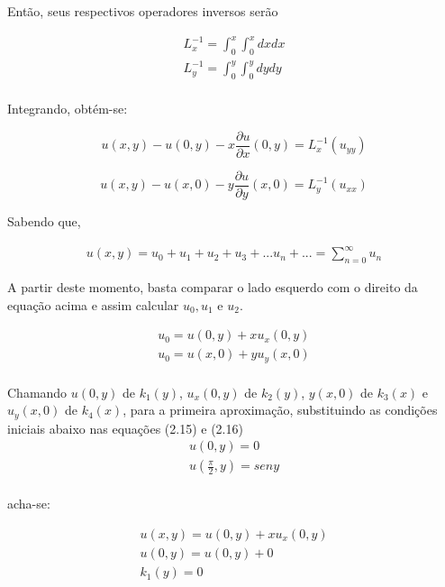 Então, seus respectivos operadores inversos serão

\begin{gather*}
L_{x}^{-1} = \int_0^x \int_0^x  dxdx\\
L_{y}^{-1} = \int_0^y \int_0^y  dydy \\
\end{gather*}

Integrando, obtém-se:

\begin{equation}
u(x,y) - u(0,y) - x\dfrac{\partial u}{\partial x}(0,y) = L_{x}^{-1}(u_{yy})
\end{equation}


\begin{equation}
u(x,y) - u(x,0) - y\dfrac{\partial u}{\partial y}(x,0) = L_{y}^{-1}(u_{xx})  
\end{equation}

Sabendo que,

\begin{gather}
u(x,y) = u_{0} + u_{1} + u_{2} + u_{3} + ... u_{n} + ... = \sum_{n=0}^{\infty}u_{n}
\end{gather}

A partir deste momento, basta comparar o lado esquerdo com o direito da equação acima e assim calcular  $u_{0}, u_{1}$  e $u_{2}$.

\begin{gather}
u_{0} = u(0,y) + xu_{x}(0,y)\nonumber\\
u_{0} = u(x,0) + yu_{y}(x,0)\nonumber\\
\end{gather}

Chamando $u(0,y)$ de  $k_{1}(y)$, $u_{x}(0,y)$ de $k_{2}(y)$, $y(x,0)$ de $k_{3}(x)$ e $u_{y}(x,0)$ de $k_{4}(x)$, para a primeira aproximação, substituindo as condições iniciais abaixo nas equações (2.15)  e (2.16)
\begin{gather}
u(0,y) = 0\nonumber\\
u\left(\frac{\pi}{2},y\right) = seny\nonumber\\
\end{gather}

acha-se:

\begin{gather}
u(x,y) = u(0,y) + xu_{x}(0,y)\nonumber\\
u(0,y) = u(0,y) + 0\nonumber\\
k_{1}(y) = 0\nonumber\\
\end{gather}

